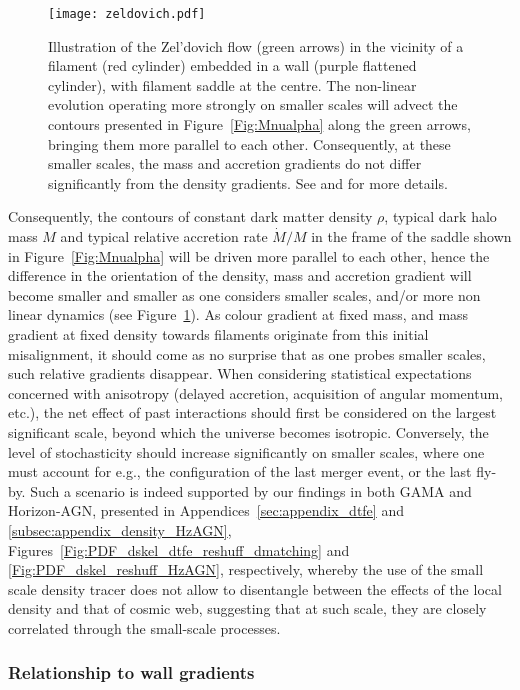 \documentclass[useAMS,usenatbib]{mnras}
\newcommand{\hagn}{\mbox{{\sc \small Horizon-AGN}}}
\begin{document}
\begin{figure}
\centering\texttt{[image: zeldovich.pdf]}
\caption{Illustration of the Zel'dovich flow (green arrows) in the vicinity of a filament (red cylinder) embedded in a wall (purple flattened cylinder), with filament saddle at the centre. 
The non-linear evolution operating more strongly on smaller scales
will advect the contours presented in Figure~\ref{Fig:Mnualpha} along the green arrows, 
bringing them more parallel to each other. Consequently, at these smaller scales, the mass and accretion gradients do not differ significantly from 
the density gradients.  See \protect\cite{Codis2015} and \protect\cite{biaspaper} for more details.
}
\label{Fig:zeldovitch}
\end{figure}


Consequently, the contours of constant dark matter density $\rho$, typical dark halo mass $M$ and typical relative accretion rate  $\dot M/M$ in the frame of the saddle shown in Figure~\ref{Fig:Mnualpha} will be driven more parallel to each other, hence the difference in the orientation of the density, mass and accretion gradient will become smaller and smaller as one considers smaller scales, and/or more non linear dynamics (see Figure~\ref{Fig:zeldovitch}). As  colour gradient at fixed mass, and mass gradient at fixed density towards filaments originate from this initial misalignment, it should come as no surprise that as one probes smaller scales, such relative gradients disappear. When considering statistical expectations concerned with anisotropy (delayed accretion, acquisition of angular momentum, etc.), the net effect of past interactions should first be considered on the largest significant scale, beyond which the universe becomes isotropic. Conversely, the level of stochasticity should increase significantly on smaller scales, where one must account for e.g., the configuration of the last merger event, or the last fly-by.
Such a scenario is indeed supported by our findings in both GAMA and \hagn, presented in Appendices~\ref{sec:appendix_dtfe} and \ref{subsec:appendix_density_HzAGN}, Figures~\ref{Fig:PDF_dskel_dtfe_reshuff_dmatching} and \ref{Fig:PDF_dskel_reshuff_HzAGN}, respectively, whereby the use of the small scale density tracer does not allow to disentangle between the effects of the local density and that of cosmic web, suggesting that at such scale, they are closely correlated through the small-scale processes. 



\subsubsection{Relationship to wall gradients}
\end{document}
